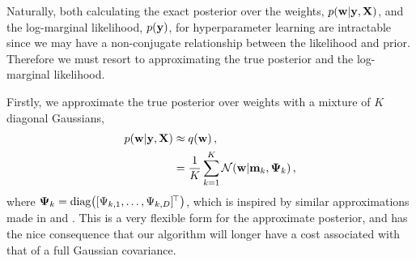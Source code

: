 \documentclass[11pt, oneside]{article}
\begin{document}
Naturally, both calculating the exact posterior over the weights,
$p\!\left({\mathbf{w}}\middle\vert{\ensuremath{\mathbf{y}}, \ensuremath{\mathbf{X}}}\right)$, and the log-marginal likelihood,
$p\!\left({\mathbf{y}}\right)$, for hyperparameter learning are intractable since we may have a
non-conjugate relationship between the likelihood and prior. Therefore we must
resort to approximating the true posterior and the log-marginal likelihood.

Firstly, we approximate the true posterior over weights with a mixture of $K$
diagonal Gaussians,
\begin{align}
    p\!\left({\mathbf{w}}\middle\vert{\ensuremath{\mathbf{y}}, \ensuremath{\mathbf{X}}}\right) &\approx q\!\left({\mathbf{w}}\right), \nonumber \\
    &= \frac{1}{K} \sum^K_{k=1} \mathcal{N}\!\left({\mathbf{w}}\middle\vert{\ensuremath{\mathbf{m}}_k, \ensuremath{\boldsymbol{\Psi}}_k}\right),
\end{align}
where $\boldsymbol{\Psi}_k = \text{diag}\!\left({[\Psi_{k,1}, \ldots, \Psi_{k, D}]^{\!\top}}\right)$, which
is inspired by similar approximations made in \citet{gershman2012} and 
\citet{nguyen2014automated}. This is a very flexible form for the approximate
posterior, and has the nice consequence that our algorithm will longer have a
 cost associated with that of a full Gaussian covariance.
\end{document}
